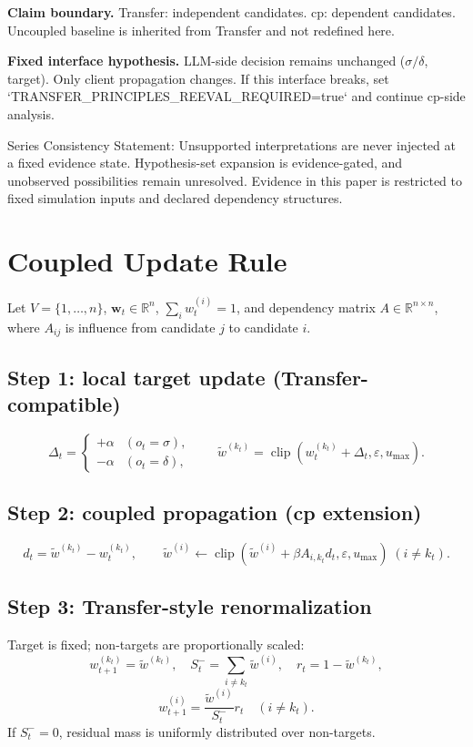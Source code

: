 \documentclass[11pt,a4paper]{article}
\begin{document}
\textbf{Claim boundary.}
Transfer: independent candidates.
cp: dependent candidates.
Uncoupled baseline is inherited from Transfer and not redefined here.

\textbf{Fixed interface hypothesis.}
LLM-side decision remains unchanged (\(\sigma/\delta\), target). Only client propagation changes. If this interface breaks, set `TRANSFER\_PRINCIPLES\_REEVAL\_REQUIRED=true` and continue cp-side analysis.

Series Consistency Statement: Unsupported interpretations are never injected at a fixed evidence state. Hypothesis-set expansion is evidence-gated, and unobserved possibilities remain unresolved. Evidence in this paper is restricted to fixed simulation inputs and declared dependency structures.

\section{Coupled Update Rule}
Let \(V=\{1,\dots,n\}\), \(\mathbf{w}_t\in\mathbb{R}^n\), \(\sum_i w_t^{(i)}=1\), and dependency matrix \(A\in\mathbb{R}^{n\times n}\), where \(A_{ij}\) is influence from candidate \(j\) to candidate \(i\).

\subsection{Step 1: local target update (Transfer-compatible)}
\[
\Delta_t = \begin{cases}
+\alpha & (o_t=\sigma),\\
-\alpha & (o_t=\delta),
\end{cases}
\qquad
\tilde{w}^{(k_t)}=\operatorname{clip}(w_t^{(k_t)}+\Delta_t,\varepsilon,u_{\max}).
\]

\subsection{Step 2: coupled propagation (cp extension)}
\[
d_t=\tilde{w}^{(k_t)}-w_t^{(k_t)},\qquad
\tilde{w}^{(i)}\leftarrow\operatorname{clip}(\tilde{w}^{(i)}+\beta A_{i,k_t}d_t,\varepsilon,u_{\max})\;(i\neq k_t).
\]

\subsection{Step 3: Transfer-style renormalization}
Target is fixed; non-targets are proportionally scaled:
\[
w_{t+1}^{(k_t)}=\tilde{w}^{(k_t)},\quad
S_t^- = \sum_{i\neq k_t}\tilde{w}^{(i)},\quad
r_t=1-\tilde{w}^{(k_t)},
\]
\[
w_{t+1}^{(i)}=\frac{\tilde{w}^{(i)}}{S_t^-}r_t\quad(i\neq k_t).
\]
If \(S_t^-=0\), residual mass is uniformly distributed over non-targets.
\end{document}
